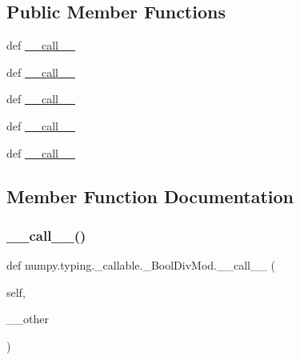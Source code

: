 \subsection*{Public Member Functions}
\begin{DoxyCompactItemize}
\item 
def \hyperlink{classnumpy_1_1typing_1_1__callable_1_1__BoolDivMod_a41ca4da772bdac532ea4eb5b569b0e9f}{\+\_\+\+\_\+call\+\_\+\+\_\+}
\item 
def \hyperlink{classnumpy_1_1typing_1_1__callable_1_1__BoolDivMod_a41ca4da772bdac532ea4eb5b569b0e9f}{\+\_\+\+\_\+call\+\_\+\+\_\+}
\item 
def \hyperlink{classnumpy_1_1typing_1_1__callable_1_1__BoolDivMod_a41ca4da772bdac532ea4eb5b569b0e9f}{\+\_\+\+\_\+call\+\_\+\+\_\+}
\item 
def \hyperlink{classnumpy_1_1typing_1_1__callable_1_1__BoolDivMod_a41ca4da772bdac532ea4eb5b569b0e9f}{\+\_\+\+\_\+call\+\_\+\+\_\+}
\item 
def \hyperlink{classnumpy_1_1typing_1_1__callable_1_1__BoolDivMod_a41ca4da772bdac532ea4eb5b569b0e9f}{\+\_\+\+\_\+call\+\_\+\+\_\+}
\end{DoxyCompactItemize}


\subsection{Member Function Documentation}
\mbox{\label{classnumpy_1_1typing_1_1__callable_1_1__BoolDivMod_a41ca4da772bdac532ea4eb5b569b0e9f}} 
\subsubsection{\texorpdfstring{\+\_\+\+\_\+call\+\_\+\+\_\+()}{\_\_call\_\_()}\hspace{0.1cm}{\footnotesize\ttfamily [1/5]}}
{\footnotesize\ttfamily def numpy.\+typing.\+\_\+callable.\+\_\+\+Bool\+Div\+Mod.\+\_\+\+\_\+call\+\_\+\+\_\+ (\begin{DoxyParamCaption}\item[{}]{self,  }\item[{}]{\+\_\+\+\_\+other }\end{DoxyParamCaption})}

